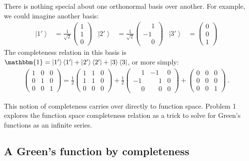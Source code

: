 \documentclass[12pt]{article}
\numberwithin{equation}{subsection}    %
\newcommand{\ket}[1]{\left|#1\right\rangle}    %
\newcommand{\bra}[1]{\left\langle#1\right|}    %
\begin{document}
There is nothing special about one orthonormal basis over another. For example, we could imagine another basis:
\begin{align}
	\ket{1'} 
	&=
	\frac{1}{\sqrt{2}}
	\begin{pmatrix}
		1 \\ 1 \\ 0
	\end{pmatrix}
	&
	\ket{2'} 
	&=
	\frac{1}{\sqrt{2}}
	\begin{pmatrix}
		\phantom{+}1 \\ -1 \\ \phantom{+}0
	\end{pmatrix}
	&
	\ket{3'} 
	&=
	\begin{pmatrix}
		0 \\ 0 \\ 1
	\end{pmatrix}
\end{align}
The completeness relation in this basis is $\mathbbm{1} = \ket{1'} \bra{1'} + \ket{2'} \bra{2'} + \ket 3 \bra 3$, or more simply:
\begin{align}
	\begin{pmatrix}
		1 & 0 & 0 \\
		0 & 1 & 0 \\
		0 & 0 & 1
	\end{pmatrix}
	= 
	\frac{1}{2}
	\begin{pmatrix}
		1 & 1 & 0 \\
		1 & 1 & 0 \\
		0 & 0 & 0
	\end{pmatrix}
	+ 
	\frac{1}{2}
	\begin{pmatrix}
		\phantom{+}1 & -1 & 0 \\
		-1 & \phantom{+}1 & 0 \\
		\phantom{+}0 & \phantom{+}0 & 0
	\end{pmatrix}
	+
	\begin{pmatrix}
		0 & 0 & 0 \\
		0 & 0 & 0 \\
		0 & 0 & 1
	\end{pmatrix} \ .
\end{align}

This notion of completeness carries over directly to function space. Problem 1 explores the function space completeness relation as a trick to solve for Green's functions as an infinite series.



\subsection{A Green's function by completeness}
\end{document}
